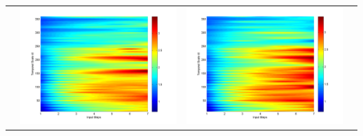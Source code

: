 \documentclass[11pt]{article}
\begin{document}
\begin{table}[H]
{\begin{tabular}{c  c   c   c  }
&\begin{minipage}{.3\textwidth}\includegraphics[width=\linewidth]{resultgraph/11532500pep.png}\end{minipage}
&\begin{minipage}{.3\textwidth}\includegraphics[width=\linewidth]{resultgraph/11532500pepq.png}\end{minipage}
\\

\end{tabular}}
\end{table}
\end{document}
